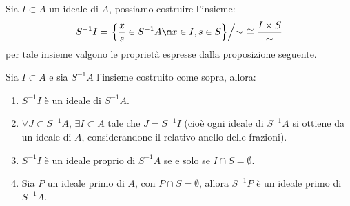 \documentclass[11pt]{scrartcl}
\begin{document}
\begin{remark}
    [Ideali di $S^{-1}A$]
    Sia $I \subset A$ un ideale di $A$, possiamo costruire l'insieme:
    \[ S^{-1}I = \left.\left\{\frac{x}{s} \in S^{-1}A \m x \in I, s \in S \right\}\middle/ \sim \right.\cong \frac{I \times S}{\sim}
        \]
    per tale insieme valgono le proprietà espresse dalla proposizione seguente.
\end{remark}

\begin{proposition}
    [Ideali di $S^{-1}A$]
    Sia $I \subset A$ e sia $S^{-1}A$ l'insieme costruito come sopra, allora:
    \begin{enumerate}[(1)]
        \item $S^{-1}I$ è un ideale di $S^{-1}A$.
        \item $\forall J \subset S^{-1}A$, $\exists I \subset A$ tale che $J = S^{-1}I$ (cioè ogni ideale di $S^{-1}A$ si ottiene da un ideale di $A$, considerandone il relativo anello delle frazioni).
        \item $S^{-1}I$ è un ideale proprio di $S^{-1}A$ se e solo se $I \cap S = \emptyset$.
        \item Sia $P$ un ideale primo di $A$, con $P \cap S = \emptyset$, allora $S^{-1}P$ è un ideale primo di $S^{-1}A$.
    \end{enumerate}
\end{proposition}
\end{document}
